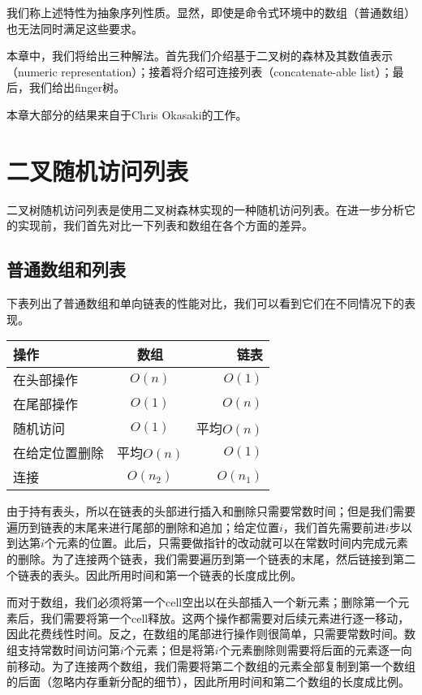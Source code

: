 \documentclass[UTF8]{article}
\begin{document}
我们称上述特性为抽象序列性质。显然，即使是命令式环境中的数组（普通数组）也无法同时满足这些要求。

本章中，我们将给出三种解法。首先我们介绍基于二叉树的森林及其数值表示（numeric representation）；接着将介绍可连接列表（concatenate-able list）；最后，我们给出finger树。

本章大部分的结果来自于Chris Okasaki的工作\cite{okasaki-book}。

\section{二叉随机访问列表}

二叉树随机访问列表是使用二叉树森林实现的一种随机访问列表。在进一步分析它的实现前，我们首先对比一下列表和数组在各个方面的差异。

\subsection{普通数组和列表}

下表列出了普通数组和单向链表的性能对比，我们可以看到它们在不同情况下的表现。

\begin{tabular}{l | c | r}
  \hline
  操作 & 数组 & 链表 \\
  \hline
  在头部操作 & $O(n)$ & $O(1)$ \\
  在尾部操作 & $O(1)$ & $O(n)$ \\
  随机访问 & $O(1)$ & 平均$O(n)$ \\
  在给定位置删除 & 平均$O(n)$ & $O(1)$ \\
  连接 & $O(n_2)$ & $O(n_1)$ \\
  \hline
\end{tabular}

由于持有表头，所以在链表的头部进行插入和删除只需要常数时间；但是我们需要遍历到链表的末尾来进行尾部的删除和追加；给定位置$i$，我们首先需要前进$i$步以到达第$i$个元素的位置。此后，只需要做指针的改动就可以在常数时间内完成元素的删除。为了连接两个链表，我们需要遍历到第一个链表的末尾，然后链接到第二个链表的表头。因此所用时间和第一个链表的长度成比例。

而对于数组，我们必须将第一个cell空出以在头部插入一个新元素；删除第一个元素后，我们需要将第一个cell释放。这两个操作都需要对后续元素进行逐一移动，因此花费线性时间。反之，在数组的尾部进行操作则很简单，只需要常数时间。数组支持常数时间访问第$i$个元素；但是将第$i$个元素删除则需要将后面的元素逐一向前移动。为了连接两个数组，我们需要将第二个数组的元素全部复制到第一个数组的后面（忽略内存重新分配的细节），因此所用时间和第二个数组的长度成比例。
\end{document}
